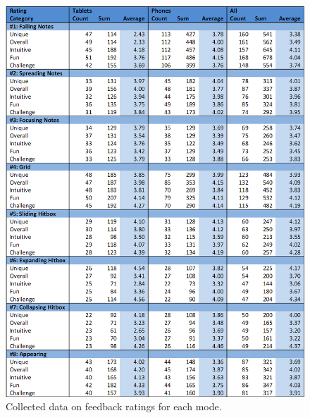 \documentclass{sig-alternate}
\begin{document}
\begin{figure}[htb!]
	\begin{center}
		\includegraphics[width=1\linewidth]{figure_data_rating}
	\end{center}
	\vspace{-12pt}
	\caption{Collected data on feedback ratings for each mode.}
	\label{fig:data_rating}
\end{figure}
\end{document}
